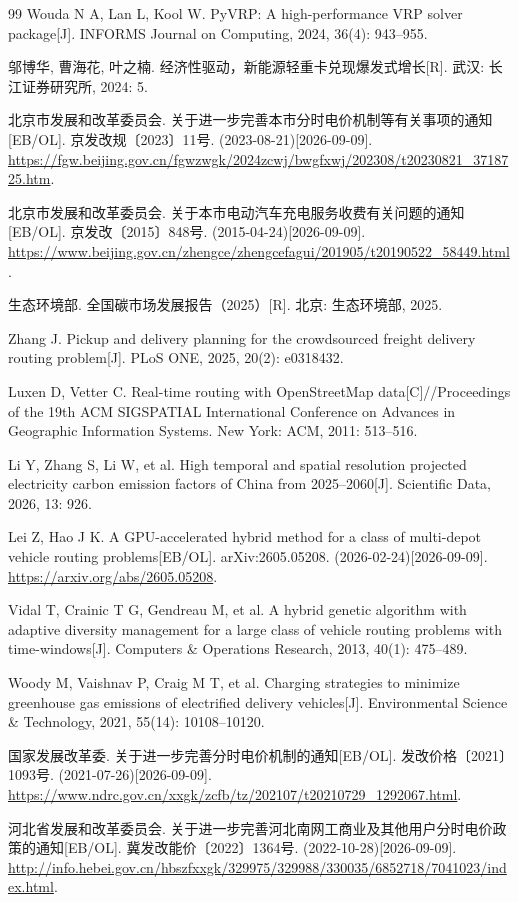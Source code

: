 \begin{thebibliography}{99}
 Wouda N A, Lan L, Kool W. PyVRP: A high-performance VRP solver package[J]. INFORMS Journal on Computing, 2024, 36(4): 943--955.

 邬博华, 曹海花, 叶之楠. 经济性驱动，新能源轻重卡兑现爆发式增长[R]. 武汉: 长江证券研究所, 2024: 5.

 北京市发展和改革委员会. 关于进一步完善本市分时电价机制等有关事项的通知[EB/OL]. 京发改规〔2023〕11号. (2023-08-21)[2026-09-09].
\url{https://fgw.beijing.gov.cn/fgwzwgk/2024zcwj/bwgfxwj/202308/t20230821_3718725.htm}.

 北京市发展和改革委员会. 关于本市电动汽车充电服务收费有关问题的通知[EB/OL]. 京发改〔2015〕848号. (2015-04-24)[2026-09-09].
\url{https://www.beijing.gov.cn/zhengce/zhengcefagui/201905/t20190522_58449.html}.

 生态环境部. 全国碳市场发展报告（2025）[R]. 北京: 生态环境部, 2025.

 Zhang J. Pickup and delivery planning for the crowdsourced freight delivery routing problem[J]. PLoS ONE, 2025, 20(2): e0318432.

 Luxen D, Vetter C. Real-time routing with OpenStreetMap data[C]//Proceedings of the 19th ACM SIGSPATIAL International Conference on Advances in Geographic Information Systems. New York: ACM, 2011: 513--516.

 Li Y, Zhang S, Li W, et al. High temporal and spatial resolution projected electricity carbon emission factors of China from 2025--2060[J]. Scientific Data, 2026, 13: 926.

 Lei Z, Hao J K. A GPU-accelerated hybrid method for a class of multi-depot vehicle routing problems[EB/OL]. arXiv:2605.05208. (2026-02-24)[2026-09-09].
\url{https://arxiv.org/abs/2605.05208}.

 Vidal T, Crainic T G, Gendreau M, et al. A hybrid genetic algorithm with adaptive diversity management for a large class of vehicle routing problems with time-windows[J]. Computers \& Operations Research, 2013, 40(1): 475--489.

 Woody M, Vaishnav P, Craig M T, et al. Charging strategies to minimize greenhouse gas emissions of electrified delivery vehicles[J]. Environmental Science \& Technology, 2021, 55(14): 10108--10120.

 国家发展改革委. 关于进一步完善分时电价机制的通知[EB/OL]. 发改价格〔2021〕1093号. (2021-07-26)[2026-09-09].
\url{https://www.ndrc.gov.cn/xxgk/zcfb/tz/202107/t20210729_1292067.html}.

 河北省发展和改革委员会. 关于进一步完善河北南网工商业及其他用户分时电价政策的通知[EB/OL]. 冀发改能价〔2022〕1364号. (2022-10-28)[2026-09-09].
\url{http://info.hebei.gov.cn/hbszfxxgk/329975/329988/330035/6852718/7041023/index.html}.

\end{thebibliography}
